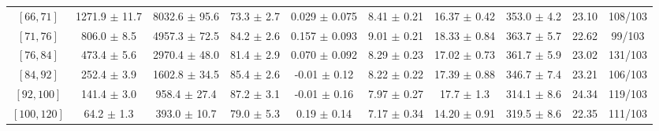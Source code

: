 \begin{tabular}{c||c|c|c|c|c|c|c||c|c}
$[66, 71]$ & 1271.9 $\pm$ 11.7 & 8032.6 $\pm$ 95.6 & 73.3 $\pm$ 2.7 & 0.029 $\pm$ 0.075 & 8.41 $\pm$ 0.21 & 16.37 $\pm$ 0.42 & 353.0 $\pm$ 4.2 & 23.10 & 108/103\\
$[71, 76]$ & 806.0 $\pm$ 8.5 & 4957.3 $\pm$ 72.5 & 84.2 $\pm$ 2.6 & 0.157 $\pm$ 0.093 & 9.01 $\pm$ 0.21 & 18.33 $\pm$ 0.84 & 363.7 $\pm$ 5.7 & 22.62 & 99/103\\
$[76, 84]$ & 473.4 $\pm$ 5.6 & 2970.4 $\pm$ 48.0 & 81.4 $\pm$ 2.9 & 0.070 $\pm$ 0.092 & 8.29 $\pm$ 0.23 & 17.02 $\pm$ 0.73 & 361.7 $\pm$ 5.9 & 23.02 & 131/103\\
$[84, 92]$ & 252.4 $\pm$ 3.9 & 1602.8 $\pm$ 34.5 & 85.4 $\pm$ 2.6 & -0.01 $\pm$ 0.12 & 8.22 $\pm$ 0.22 & 17.39 $\pm$ 0.88 & 346.7 $\pm$ 7.4 & 23.21 & 106/103\\
$[92, 100]$ & 141.4 $\pm$ 3.0 & 958.4 $\pm$ 27.4 & 87.2 $\pm$ 3.1 & -0.01 $\pm$ 0.16 & 7.97 $\pm$ 0.27 & 17.7 $\pm$ 1.3 & 314.1 $\pm$ 8.6 & 24.34 & 119/103\\
$[100, 120]$ & 64.2 $\pm$ 1.3 & 393.0 $\pm$ 10.7 & 79.0 $\pm$ 5.3 & 0.19 $\pm$ 0.14 & 7.17 $\pm$ 0.34 & 14.20 $\pm$ 0.91 & 319.5 $\pm$ 8.6 & 22.35 & 111/103\\
\end{tabular}
